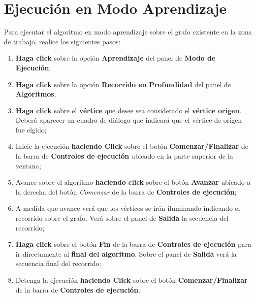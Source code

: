 \documentclass{book}
\begin{document}
\section{Ejecución en Modo Aprendizaje}

Para ejecutar el algoritmo en modo aprendizaje sobre el grafo existente en la zona de trabajo, realice los siguientes pasos:
\medskip

\begin{enumerate}
	\itemsep=8pt \topsep=0pt \partopsep=0pt \parskip=0pt \parsep=0pt

	\item \textbf{Haga click} sobre la opción \textbf{Aprendizaje} del panel de \textbf{Modo de Ejecución};

	\item \textbf{Haga click} sobre la opción \textbf{Recorrido en Profundidad} del panel de \textbf{Algoritmos};

	\item \textbf{Haga click} sobre el \textbf{vértice} que desee sea considerado el \textbf{vértice origen}. Deberá aparecer un cuadro de diálogo que indicará que el vértice de origen fue elgido;

	\item Inicie la ejecución \textbf{haciendo Click} sobre el botón \textbf{Comenzar/Finalizar} de la barra de \textbf{Controles de ejecución} ubicado en la parte superior de la ventana;

	\item Avance sobre el algoritmo \textbf{haciendo click} sobre el botón \textbf{Avanzar} ubicado a la derecha del botón \textit{Comenzar} de la barra de \textbf{Controles de ejecución};

	\item A medida que avance verá que los vértices se irán iluminando indicando el recorrido sobre el grafo. Verá sobre el panel de \textbf{Salida} la secuencia del recorrido;

	\item \textbf{Haga click} sobre el botón \textbf{Fin} de la barra de \textbf{Controles de ejecución} para ir directamente al \textbf{final del algoritmo}. Sobre el panel de \textbf{Salida} verá la secuencia final del recorrido;

	\item Detenga la ejecución \textbf{haciendo Click} sobre el botón \textbf{Comenzar/Finalizar} de la barra de \textbf{Controles de ejecución}.

\end{enumerate}
\medskip
\end{document}

